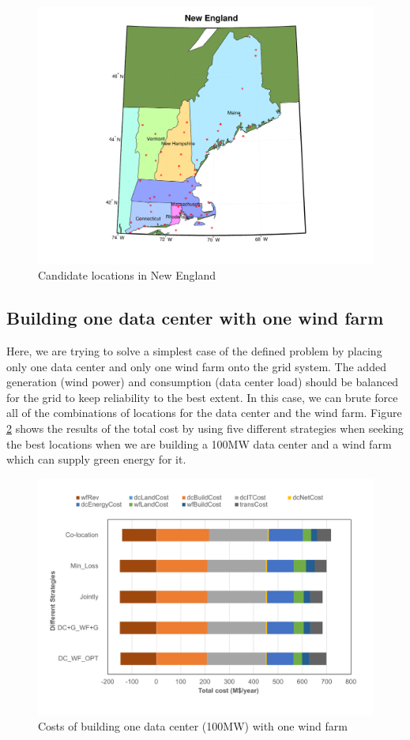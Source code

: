 \begin{figure}[ht]
\centering
\includegraphics[width=1\columnwidth]{img/NE_map}
\caption{Candidate locations in New England}
\label{fig:NE_locs}
\end{figure}

\subsection{Building one data center with one wind farm}

Here, we are trying to solve a simplest case of the defined problem by placing only one data center and only one wind farm onto the grid system. The added generation (wind power) and consumption (data center load) should be balanced for the grid to keep reliability to the best extent. In this case, we can brute force all of the combinations of locations for the data center and the wind farm. Figure \ref{fig:cost1dc1wf} shows the results of the total cost by using five different strategies when seeking the best locations when we are building a 100MW data center and a wind farm which can supply green energy for it.

\begin{figure}[ht]
\centering
\includegraphics[width=1\columnwidth]{img/cost-one-dc-one-wf}
\caption{Costs of building one data center (100MW) with one wind farm}
\label{fig:cost1dc1wf}
\end{figure}

